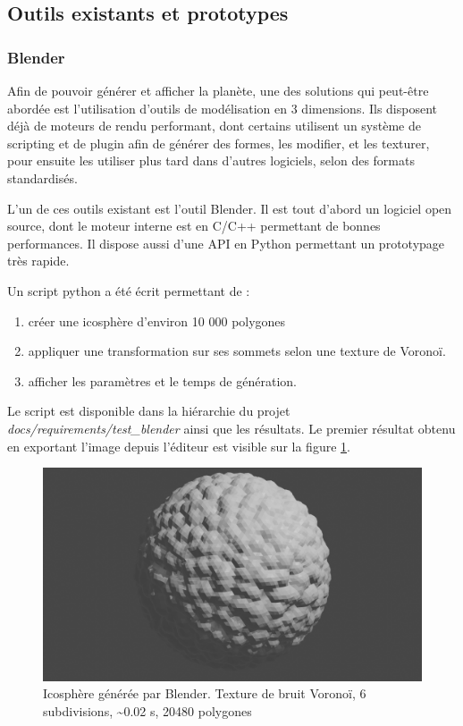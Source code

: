 \documentclass[a4paper]{article}
\begin{document}
\subsection{Outils existants et prototypes}

\subsubsection{Blender}

Afin de pouvoir générer et afficher la planète, une des solutions qui peut-être abordée est l'utilisation d'outils de modélisation en 3 dimensions. Ils disposent déjà de moteurs de rendu performant, dont certains utilisent un système de scripting et de plugin afin de générer des formes, les modifier, et les texturer, pour ensuite les utiliser plus tard dans d'autres logiciels, selon des formats standardisés.

L'un de ces outils existant est l'outil Blender. Il est tout d'abord un logiciel open source, dont le moteur interne est en C/C++ permettant de bonnes performances. Il dispose aussi d'une API en Python permettant un prototypage très rapide.

Un script python a été écrit permettant de :
\begin{enumerate}
            \item {créer une icosphère d'environ 10 000 polygones}
            \item {appliquer une transformation sur ses sommets selon une texture de Voronoï.}
            \item {afficher les paramètres et le temps de génération.}
\end{enumerate}

Le script est disponible dans la hiérarchie du projet \textit{docs/requirements/test\_blender} ainsi que les résultats. Le premier résultat obtenu en exportant l'image depuis l'éditeur est visible sur la figure \ref{blendericos}.\\

\begin{figure}[!ht]
\begin{center} \includegraphics[width=0.8\linewidth]{img/blender/blender_1.png} \end{center}
\caption{\label{blendericos}Icosphère générée par Blender. Texture de bruit Voronoï, 6 subdivisions, \textasciitilde0.02 s, 20480 polygones}
\end{figure}
\end{document}

